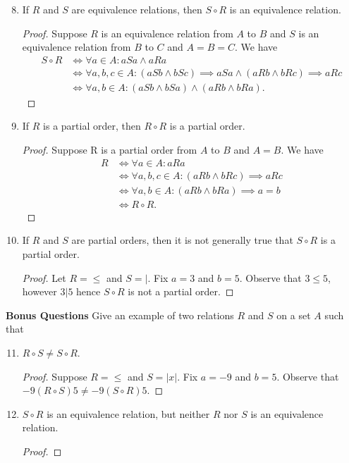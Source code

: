 \documentclass{article}
\begin{document}
  \begin{enumerate} \setcounter{enumi}{7}
    \item If $R$ and $S$ are equivalence relations, then $S \circ R$ is an equivalence relation.
      \begin{proof}
        Suppose $R$ is an equivalence relation from $A$ to $B$ and $S$ is an equivalence relation from $B$ to $C$ and $A = B = C$. We have
        \begin{align*}
          S \circ R &\iff \forall a\in A : aSa \wedge aRa \\
          &\iff \forall a,b,c\in A: (aSb \wedge bSc) \implies aSa \wedge (aRb \wedge bRc) \implies aRc \\
	  &\iff \forall a,b\in A: (aSb \wedge bSa) \wedge (aRb \wedge bRa).
        \end{align*}
      \end{proof}
    \item If $R$ is a partial order, then $R \circ R$ is a partial order.
      \begin{proof}
      Suppose R is a partial order from $A$ to $B$ and $A = B$. We have
        \begin{align*}
          R &\iff \forall a\in A: aRa \\
            &\iff \forall a,b, c\in A: (aRb \wedge bRc) \implies aRc \\
	    &\iff \forall a,b\in A: (aRb \wedge bRa) \implies a = b \\
	    &\iff R \circ R.
        \end{align*}
      \end{proof}
    \item If $R$ and $S$ are partial orders, then it is not generally true that $S \circ R$ is a partial order.
      \begin{proof}
        Let $R = \le$ and $S = |$. Fix $a = 3$ and $b = 5$. Observe that $3 \le 5$, however $3 | 5$ hence $S \circ R$ is not a partial order.
      \end{proof}
  \end{enumerate}
  \textbf{Bonus Questions}
  Give an example of two relations $R$ and $S$ on a set $A$ such that \\
  \begin{enumerate} \setcounter{enumi}{10}
    \item $R \circ S \neq S \circ R$.
      \begin{proof}
        Suppose $R = \le$ and $S = |x|$. Fix $a = -9$ and $b = 5$. Observe that $-9 (R \circ S)5 \neq -9 (S \circ R) 5$.  
      \end{proof}
    \item $S \circ R$ is an equivalence relation, but neither $R$ nor $S$ is an equivalence relation.
      \begin{proof}
        
      \end{proof}
   \end{enumerate}
\end{document}
